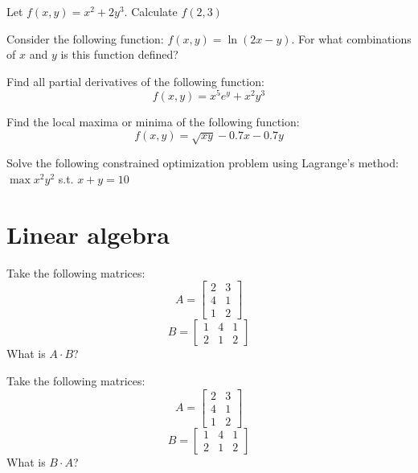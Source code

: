 \documentclass[10pt]{article}
\newenvironment{problem}[2][Problem]{\begin{trivlist}
\item[\hskip \labelsep {\bfseries #1}\hskip \labelsep {\bfseries #2.}]}{\end{trivlist}}
\begin{document}
\begin{problem}{3.8}
Let $f(x,y)=x^2+2y^3$. Calculate $f(2,3)$
\end{problem}

\begin{problem}{3.9}
Consider the following function: $f(x,y)=\ln(2x-y)$. For what combinations of $x$ and $y$ is this function defined?
\end{problem}

\begin{problem}{3.10}
Find all partial derivatives of the following function:
$$f(x,y)= x^5e^y+x^2y^3$$
\end{problem}

\begin{problem}{3.11}
Find the local maxima or minima of the following function:
$$f(x,y)=\sqrt{xy}-0.7x-0.7y$$
\end{problem}

\begin{problem}{3.12}
Solve the following constrained optimization problem using Lagrange's method:
$\max x^2y^2$ s.t. $x+y=10$
\end{problem}

\section{Linear algebra}

\begin{problem}{4.1}
Take the following matrices:
$$A=\begin{bmatrix} 2 & 3\\ 4 & 1 \\ 1 & 2\end{bmatrix}$$
$$B=\begin{bmatrix} 1 & 4 & 1\\2 & 1 & 2\end{bmatrix}$$
What is $A \cdot B$?
\end{problem}

\begin{problem}{4.2}
Take the following matrices:
$$A=\begin{bmatrix} 2 & 3\\ 4 & 1 \\ 1 & 2\end{bmatrix}$$
$$B=\begin{bmatrix} 1 & 4 & 1\\2 & 1 & 2\end{bmatrix}$$
What is $B \cdot A$?
\end{problem}
\end{document}
